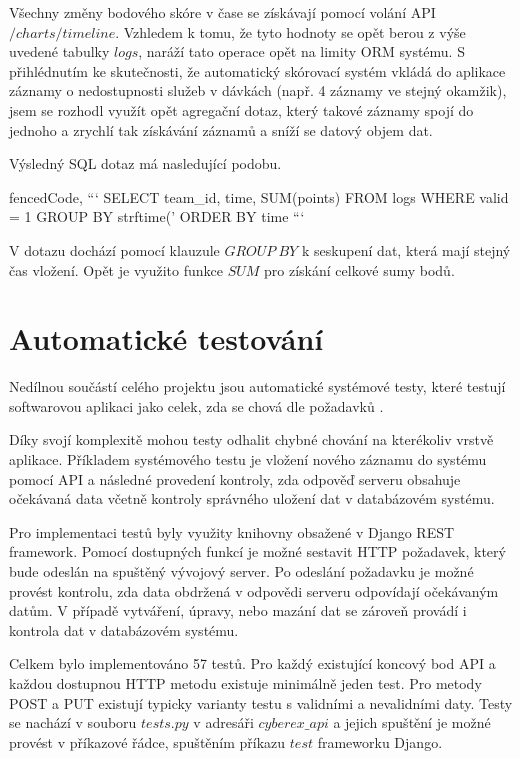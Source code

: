 \documentclass[
  digital, %
  twoside, %
  table,   %
  nolof,     %
  nolot,     %
]{fithesis3}
\begin{document}
Všechny změny bodového skóre v čase se získávají pomocí volání API $/charts/timeline$. Vzhledem k tomu, že tyto hodnoty se opět berou z výše uvedené tabulky $logs$, naráží tato operace opět na limity ORM systému. S přihlédnutím ke skutečnosti, že automatický skórovací systém vkládá do aplikace záznamy o nedostupnosti služeb v dávkách (např. 4 záznamy ve stejný okamžik), jsem se rozhodl využít opět agregační dotaz, který takové záznamy spojí do jednoho a zrychlí tak získávání záznamů a sníží se datový objem dat.

Výsledný SQL dotaz má nasledující podobu.

\begin{markdown*}{%
  fencedCode,
}
```
SELECT team_id, time, SUM(points) FROM logs 
WHERE valid = 1 
GROUP BY strftime('%
ORDER BY time
```
\end{markdown*}

V dotazu dochází pomocí klauzule $GROUP\ BY$ k seskupení dat, která mají stejný čas vložení. Opět je využito funkce $SUM$ pro získání celkové sumy bodů.

\section{Automatické testování}

Nedílnou součástí celého projektu jsou automatické systémové testy, které testují softwarovou aplikaci jako celek, zda se chová dle požadavků \cite{difSysTest}.

Díky svojí komplexitě mohou testy odhalit chybné chování na kterékoliv vrstvě aplikace. Příkladem systémového testu je vložení nového záznamu do systému pomocí API a následné provedení kontroly, zda odpověď serveru obsahuje očekávaná data včetně kontroly správného uložení dat v databázovém systému.

Pro implementaci testů byly využity knihovny obsažené v Django REST framework. Pomocí dostupných funkcí je možné sestavit HTTP požadavek, který bude odeslán na spuštěný vývojový server. Po odeslání požadavku je možné provést kontrolu, zda data obdržená v odpovědi serveru odpovídají očekávaným datům. V případě vytváření, úpravy, nebo mazání dat se zároveň provádí i kontrola dat v databázovém systému. 

Celkem bylo implementováno 57 testů. Pro každý existující koncový bod API a každou dostupnou HTTP metodu existuje minimálně jeden test. Pro metody POST a PUT existují typicky varianty testu s validními a nevalidními daty. Testy se nachází v souboru $tests.py$ v adresáři $cyberex\_api$ a jejich spuštění je možné provést v příkazové řádce, spuštěním příkazu $test$ frameworku Django.
\end{document}
